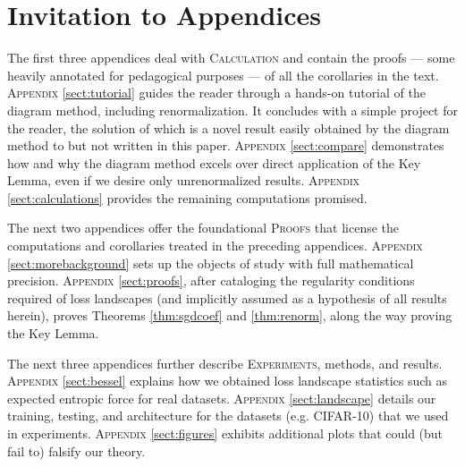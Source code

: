 \documentclass{article}
\theoremstyle{plain}
\theoremstyle{definition}
\begin{document}

    
    


\renewcommand{\thesection}{\Alph{section}}
\setcounter{section}{0}

\section*{Invitation to Appendices}
    The first three appendices deal with \textsc{Calculation} and contain the
    proofs --- some heavily annotated for pedagogical purposes --- of all the
    corollaries in the text.
    \textsc{Appendix} \ref{sect:tutorial} guides the reader through a hands-on tutorial
        of the diagram method, including renormalization.  It concludes with a
        simple project for the reader, the solution of which is a novel result
        easily obtained by the diagram method to but not written in this paper. 
    \textsc{Appendix} \ref{sect:compare} demonstrates how and why the diagram method
        excels over direct application of the Key Lemma, even if we desire only
        unrenormalized results.
    \textsc{Appendix} \ref{sect:calculations} provides the remaining computations
        promised.

    The next two appendices offer the foundational \textsc{Proofs} that
    license the computations and corollaries treated in the preceding
    appendices.
    \textsc{Appendix} \ref{sect:morebackground} sets up the objects of study with full
        mathematical precision.
    \textsc{Appendix} \ref{sect:proofs}, after cataloging the regularity conditions
        required of loss landscapes (and implicitly assumed as a hypothesis
        of all results herein), proves Theorems \ref{thm:sgdcoef} and
        \ref{thm:renorm}, along the way proving the Key Lemma.

    The next three appendices further describe \textsc{Experiments}, methods,
    and results.
    \textsc{Appendix} \ref{sect:bessel} explains how we obtained loss landscape
        statistics such as expected entropic force for real datasets.
    \textsc{Appendix} \ref{sect:landscape} details our training, testing, and
        architecture for the datasets (e.g. CIFAR-10) that we used in
        experiments.
    \textsc{Appendix} \ref{sect:figures} exhibits additional plots that could (but fail
        to) falsify our theory.
\end{document}
